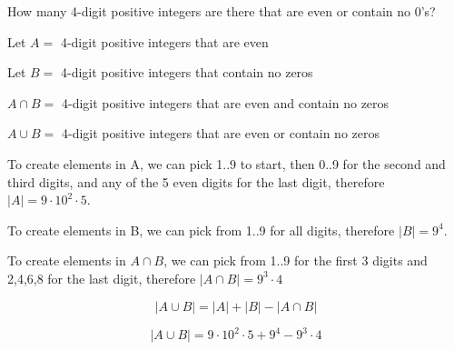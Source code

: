 \documentclass[openany, 12pt]{book}
\begin{document}
\begin{exercise}{}{}
	How many 4-digit positive integers are there that are even or contain no 0's?
	\begin{alist}
		\item Let $A=$ 4-digit positive integers that are even
		\item Let $B=$ 4-digit positive integers that contain no zeros
		\item $A \cap B=$ 4-digit positive integers that are even and contain no zeros
		\item $A \cup B=$ 4-digit positive integers that are even or contain no zeros
		\item To create elements in A, we can pick 1..9 to start, then 0..9 for the
		second and third digits, and any of the 5 even digits for the last
		digit, therefore $|A|=9\cdot 10^2\cdot5$.
		\item To create elements in B, we can pick from 1..9 for all digits,
		therefore $|B|=9^4$.
		\item To create elements in $A\cap B$, we can pick from 1..9 for the first
		3 digits and 2,4,6,8 for the last digit, therefore $|A\cap B|=9^3\cdot4$
		\item $$|A\cup B| = |A| + |B| - |A\cap B|$$
		\item $$|A\cup B| = 9\cdot10^2\cdot5 + 9^4 - 9^3\cdot4$$
	\end{alist}
\end{exercise}
\end{document}
